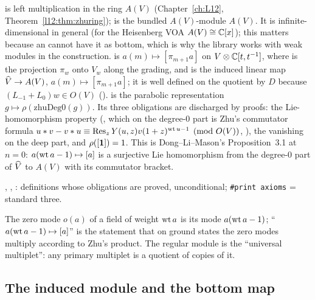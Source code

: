 \begin{dictionary}
 is left multiplication in the ring $A(V)$ (Chapter~\ref{ch:L12},
Theorem~\ref{l12:thm:zhuring});  is the bundled $A(V)$-module $A(V)$. It is infinite-dimensional in
general (for the Heisenberg VOA $A(V)\cong{\mathbb{C}}[x]$); this matters because an  cannot have it as bottom,
which is why the library works with weak modules in the construction.  is $a(m)\mapsto[\pi_{m+1}a]$ on $V\otimes{\mathbb{C}}[t,t^{-1}]$, where  is the projection $\pi_w$ onto $V_w$ along the grading, and  is the induced linear map
$\widehat{V}\to A(V)$, $a(m)\mapsto[\pi_{m+1}a]$; it is well defined on the quotient by $D$ because
$(L_{-1}+L_0)w\in O(V)$ ().  is the parabolic representation
$g\mapsto\rho(\text{zhuDeg0}(g))$. Its three obligations are discharged by proofs: the Lie-homomorphism property
(, which on the degree-$0$ part is Zhu's commutator formula
$u*v-v*u\equiv\operatorname{Res}_zY(u,z)v(1+z)^{\operatorname{wt} u-1}\pmod{O(V)}$, ), the vanishing on the deep part, and
$\rho([\mathbf{1}]) = 1$. This is Dong--Li--Mason's Proposition~3.1 at $n=0$: $a(\operatorname{wt} a-1)\mapsto[a]$ is a surjective
Lie homomorphism from the degree-$0$ part of $\widehat{V}$ to $A(V)$ with its commutator bracket.
\end{dictionary}

\begin{status}
, , : definitions whose obligations are proved, unconditional;
\texttt{\#print axioms} = standard three.
\end{status}

\begin{physics}
The zero mode $o(a)$ of a field of weight $\operatorname{wt} a$ is its mode $a(\operatorname{wt} a-1)$; ``$a(\operatorname{wt} a-1)\mapsto[a]$'' is the
statement that on ground states the zero modes multiply according to Zhu's product. The regular module is the
``universal multiplet'': any primary multiplet is a quotient of copies of it.
\end{physics}

\subsection{The induced module and the bottom map}

